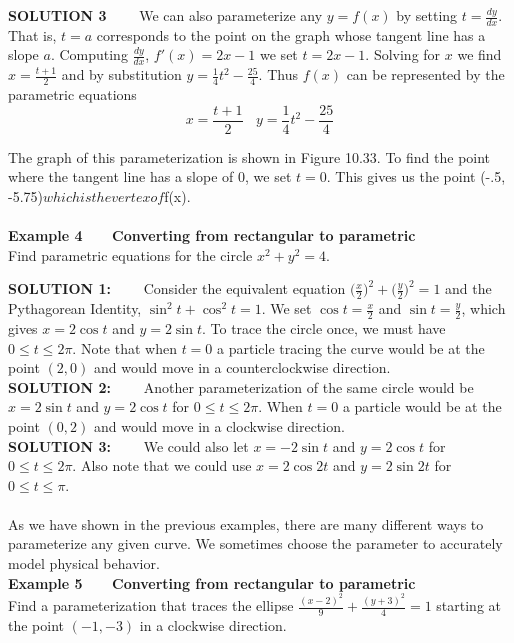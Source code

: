 \documentclass[11pt]{report}
\newcommand{\ds}{\displaystyle}
\begin{document}
\textbf{SOLUTION 3}~~~~ We can also parameterize any $y=f(x)$ by setting $t=\frac{dy}{dx}$. That is, $t=a$ corresponds to the point on the graph whose tangent line has a slope $a$. Computing $\frac{dy}{dx}$, $f'(x) = 2x-1$ we set $t=2x-1$. Solving for $x$ we find $x=\frac{t+1}{2}$ and by substitution $y=\frac{1}{4}t^2 - \frac{25}{4}$. Thus $f(x)$ can be represented by the parametric equations
$$x=\frac{t+1}{2} ~~~~y=\frac{1}{4}t^2 - \frac{25}{4}$$

The graph of this parameterization is shown in Figure 10.33. To find the point where the tangent line has a slope of $0$, we set $t=0$. This gives us the point (-.5, -5.75)$ which is the vertex of $f(x).\\ \\

\textbf{Example 4~~~ Converting from rectangular to parametric}\\
Find parametric equations for the circle $x^2+y^2=4$.

\textbf{SOLUTION 1:} ~~~~Consider the equivalent equation $\ds \biggl(\frac{x}{2}\biggr)^2+ \biggl(\frac{y}{2}\biggr)^2=1$ and the Pythagorean Identity, $\sin^2t+\cos^2 t=1$. We set $\cos t=\frac{x}{2}$ and $\sin t=\frac{y}{2}$, which gives $x=2\cos t$ and $y=2\sin t$. To trace the circle once, we must have $0\leq t \leq 2\pi$. Note that when $t=0$ a particle tracing the curve would be at the point $(2,0)$ and would move in a counterclockwise direction. \\

\textbf{SOLUTION 2:} ~~~~Another parameterization of the same circle would be $x=2\sin t$ and $y=2\cos t$ for $0\leq t \leq 2\pi$. When $t=0$ a particle would be at the point $(0,2)$ and would move in a clockwise direction. \\

\textbf{SOLUTION 3:} ~~~~We could also let $x=-2\sin t$ and $y=2
\cos t$ for $0\leq t \leq 2\pi$. Also note that we could use $x=2\cos 2t$ and $y=2\sin 2t$ for $0\leq t \leq \pi$. \\ \\

As we have shown in the previous examples, there are many different ways to parameterize any given curve. We sometimes choose the parameter to accurately model physical behavior.\\

\textbf{Example 5~~~ Converting from rectangular to parametric}\\

Find a parameterization that traces the ellipse $\ds \frac{(x-2)^2}{9}+\frac{(y+3)^2}{4}=1$ starting at the point $(-1,-3)$ in a clockwise direction.
\end{document}
